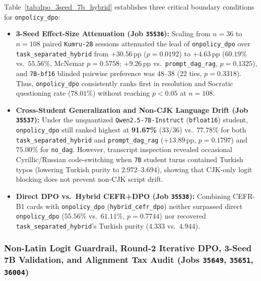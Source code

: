 \documentclass[a4paper,12pt]{report}
\begin{document}
Table~\ref{tab:dpo_3seed_7b_hybrid} establishes three critical boundary conditions for \texttt{onpolicy\_dpo}:
\begin{itemize}
    \item \textbf{3-Seed Effect-Size Attenuation (Job \texttt{35536}):} Scaling from $n=36$ to $n=108$ paired \texttt{Kumru-2B} sessions attenuated the lead of \texttt{onpolicy\_dpo} over \texttt{task\_separated\_hybrid} from $+30.56$\,pp ($p=0.0192$) to $+4.63$\,pp ($60.19\%$ vs.\ $55.56\%$, McNemar $p=0.5758$; $+9.26$\,pp vs.\ \texttt{prompt\_dag\_rag}, $p=0.1325$), and \texttt{7B-bf16} blinded pairwise preference was $48$--$38$ (22 ties, $p=0.3318$). Thus, \texttt{onpolicy\_dpo} consistently ranks first in resolution and Socratic questioning rate ($78.01\%$) without reaching $p < 0.05$ at $n=108$.
    \item \textbf{Cross-Student Generalization and Non-CJK Language Drift (Job \texttt{35537}):} Under the unquantized \texttt{Qwen2.5-7B-Instruct} (\texttt{bfloat16}) student, \texttt{onpolicy\_dpo} still ranked highest at \textbf{91.67\%} ($33/36$) vs.\ $77.78\%$ for both \texttt{task\_separated\_hybrid} and \texttt{prompt\_dag\_rag} ($+13.89$\,pp, $p=0.1797$) and $75.00\%$ for \texttt{no\_dag}. However, transcript inspection revealed occasional Cyrillic/Russian code-switching when \texttt{7B} student turns contained Turkish typos (lowering Turkish purity to $2.972$--$3.694$), showing that CJK-only logit blocking does not prevent non-CJK script drift.
    \item \textbf{Direct DPO vs.\ Hybrid CEFR+DPO (Job \texttt{35538}):} Combining CEFR-B1 cards with \texttt{onpolicy\_dpo} (\texttt{hybrid\_cefr\_dpo}) neither surpassed direct \texttt{onpolicy\_dpo} ($55.56\%$ vs.\ $61.11\%$, $p=0.7744$) nor recovered \texttt{task\_separated\_hybrid}'s Turkish purity ($4.333$ vs.\ $4.944$).
\end{itemize}

\subsubsection{Non-Latin Logit Guardrail, Round-2 Iterative DPO, 3-Seed 7B Validation, and Alignment Tax Audit (Jobs \texttt{35649}, \texttt{35651}, \texttt{36004})}
\label{sec:nonlatin_dpo_r2_align_tax}
\end{document}

